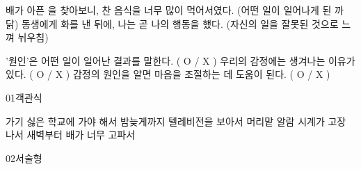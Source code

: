 \documentclass[fs12,seriesSau]{korfarm-base}
\begin{document}

\kfActivityBg \par{}\par\nopagebreak[4]\smallskip\nopagebreak[4]
\begin{kfBlankList}
\kfBlankItem 배가 아픈 \kfFillBlank[42mm]{}을 찾아보니, 찬 음식을 너무 많이 먹어서였다.   (어떤 일이 일어나게 된 까닭)
\kfBlankItem 동생에게 화를 낸 뒤에, 나는 곧 나의 행동을 \kfFillBlank[42mm]{}했다.   (자신의 일을 잘못된 것으로 느껴 뉘우침)
\end{kfBlankList}

\kfActivityBg \par{}\par\nopagebreak[4]\smallskip\nopagebreak[4]
\begin{kfOXList}
\kfOXItem '원인'은 어떤 일이 일어난 결과를 말한다. ( O / X ) \kfOX
\kfOXItem 우리의 감정에는 생겨나는 이유가 있다. ( O / X ) \kfOX
\kfOXItem 감정의 원인을 알면 마음을 조절하는 데 도움이 된다. ( O / X ) \kfOX
\end{kfOXList}


\begin{kfQBlock}{01}{객관식}
\begin{kfChoices}
\kfChoice 가기 싫은 학교에 가야 해서
\kfChoice 밤늦게까지 텔레비전을 보아서
\kfChoice 머리맡 알람 시계가 고장 나서
\kfChoice 새벽부터 배가 너무 고파서
\end{kfChoices}
\end{kfQBlock}
\begin{kfQBlock}{02}{서술형}
\end{kfQBlock}


\end{document}
